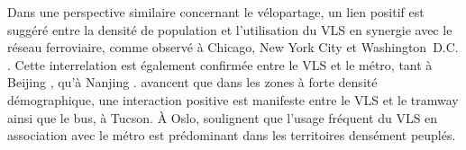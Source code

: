 \begin{refsegment}
Dans une perspective similaire concernant le vélopartage, un lien positif est suggéré entre la densité de population et l'utilisation du \acrshort{VLS} en synergie avec le réseau ferroviaire, comme observé à Chicago, New York City et Washington~D.C. \textcolor{blue}{\autocite[16]{kong_deciphering_2020}}. Cette interrelation est également confirmée entre le \acrshort{VLS} et le métro, tant à Beijing \textcolor{blue}{\autocite[9]{yu_understanding_2021}}, qu'à Nanjing \textcolor{blue}{\autocite[12]{chen_what_2022}}. \textcolor{blue}{\textcite[15]{li_investigating_2022}} avancent que dans les zones à forte densité démographique, une interaction positive est manifeste entre le \acrshort{VLS} et le tramway ainsi que le bus, à Tucson. À Oslo, \textcolor{blue}{\textcite[399]{bocker_bike_2020}} soulignent que l'usage fréquent du \acrshort{VLS} en association avec le métro est prédominant dans les territoires densément peuplés.%


\end{refsegment}
